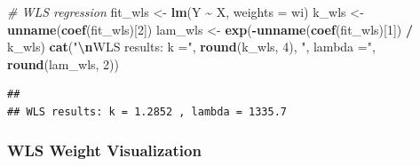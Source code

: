 \documentclass[
]{article}
\newenvironment{Shaded}{\begin{snugshade}}{\end{snugshade}}
\newcommand{\AttributeTok}[1]{\textcolor[rgb]{0.13,0.29,0.53}{#1}}
\newcommand{\CommentTok}[1]{\textcolor[rgb]{0.56,0.35,0.01}{\textit{#1}}}
\newcommand{\DecValTok}[1]{\textcolor[rgb]{0.00,0.00,0.81}{#1}}
\newcommand{\FunctionTok}[1]{\textcolor[rgb]{0.13,0.29,0.53}{\textbf{#1}}}
\newcommand{\NormalTok}[1]{#1}
\newcommand{\OtherTok}[1]{\textcolor[rgb]{0.56,0.35,0.01}{#1}}
\newcommand{\SpecialCharTok}[1]{\textcolor[rgb]{0.81,0.36,0.00}{\textbf{#1}}}
\newcommand{\StringTok}[1]{\textcolor[rgb]{0.31,0.60,0.02}{#1}}
\begin{document}
\begin{Shaded}
\begin{Highlighting}[]
\CommentTok{\# WLS regression}
\NormalTok{fit\_wls }\OtherTok{\textless{}{-}} \FunctionTok{lm}\NormalTok{(Y }\SpecialCharTok{\textasciitilde{}}\NormalTok{ X, }\AttributeTok{weights =}\NormalTok{ wi)}
\NormalTok{k\_wls }\OtherTok{\textless{}{-}} \FunctionTok{unname}\NormalTok{(}\FunctionTok{coef}\NormalTok{(fit\_wls)[}\DecValTok{2}\NormalTok{])}
\NormalTok{lam\_wls }\OtherTok{\textless{}{-}} \FunctionTok{exp}\NormalTok{(}\SpecialCharTok{{-}}\FunctionTok{unname}\NormalTok{(}\FunctionTok{coef}\NormalTok{(fit\_wls)[}\DecValTok{1}\NormalTok{]) }\SpecialCharTok{/}\NormalTok{ k\_wls)}
\FunctionTok{cat}\NormalTok{(}\StringTok{"}\SpecialCharTok{\textbackslash{}n}\StringTok{WLS results: k ="}\NormalTok{, }\FunctionTok{round}\NormalTok{(k\_wls, }\DecValTok{4}\NormalTok{), }\StringTok{", lambda ="}\NormalTok{, }\FunctionTok{round}\NormalTok{(lam\_wls, }\DecValTok{2}\NormalTok{))}
\end{Highlighting}
\end{Shaded}

\begin{verbatim}
## 
## WLS results: k = 1.2852 , lambda = 1335.7
\end{verbatim}

\subsubsection{WLS Weight Visualization}\label{wls-weight-visualization}
\end{document}
